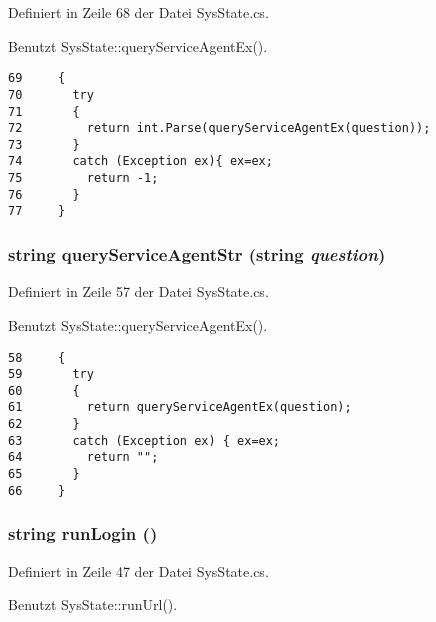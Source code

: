 Definiert in Zeile 68 der Datei Sys\-State.cs.

Benutzt Sys\-State::query\-Service\-Agent\-Ex().



\footnotesize\begin{verbatim}69     { 
70       try 
71       {
72         return int.Parse(queryServiceAgentEx(question));
73       } 
74       catch (Exception ex){ ex=ex;
75         return -1;
76       }
77     }
\end{verbatim}\normalsize 
\hypertarget{classQbeSAS_1_1SysState_QbeSAS_1_1SysStatee4}{
\subsubsection[queryServiceAgentStr]{\setlength{\rightskip}{0pt plus 5cm}string query\-Service\-Agent\-Str (string {\em question})}}
\label{classQbeSAS_1_1SysState_QbeSAS_1_1SysStatee4}




Definiert in Zeile 57 der Datei Sys\-State.cs.

Benutzt Sys\-State::query\-Service\-Agent\-Ex().



\footnotesize\begin{verbatim}58     {
59       try 
60       {
61         return queryServiceAgentEx(question);
62       } 
63       catch (Exception ex) { ex=ex;
64         return "";
65       }
66     }
\end{verbatim}\normalsize 
\hypertarget{classQbeSAS_1_1SysState_QbeSAS_1_1SysStatee2}{
\subsubsection[runLogin]{\setlength{\rightskip}{0pt plus 5cm}string run\-Login ()}}
\label{classQbeSAS_1_1SysState_QbeSAS_1_1SysStatee2}




Definiert in Zeile 47 der Datei Sys\-State.cs.

Benutzt Sys\-State::run\-Url().



